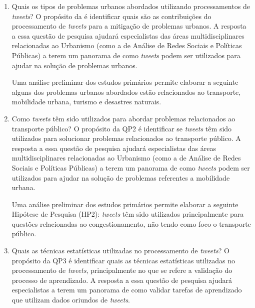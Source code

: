 \documentclass[
	12pt,				%
	oneside,			%
	a4paper,			%
	english,			%
	brazil				%
	]{abntex2ppgsi}
\begin{document}
{{\begin{enumerate}

\item Quais os tipos de problemas urbanos abordados utilizando processamentos de \textit{tweets}?
\label{item:1} \newline \newline
O propósito da  é identificar quais são as contribuições do processamento de \textit{tweets} para a mitigação de problemas urbanos. A resposta a essa questão de pesquisa ajudará especialistas das áreas multidisciplinares relacionadas ao Urbanismo (como a de Análise de Redes Sociais e Políticas Públicas) a terem um panorama de como \textit{tweets} podem ser utilizados para ajudar na solução de problemas urbanos. \newline

Uma análise preliminar dos estudos primários permite elaborar a seguinte  alguns dos problemas urbanos abordados estão relacionados ao transporte, mobilidade urbana, turismo e desastres naturais. \newline

\item Como \textit{tweets} têm sido utilizados para abordar problemas relacionados ao transporte público? \newline \newline
\label{item:2}
O propósito da QP2 é identificar se \textit{tweets} têm sido utilizados para solucionar problemas relacionados ao transporte público. A resposta a essa questão de pesquisa ajudará especialistas das áreas multidisciplinares relacionadas ao Urbanismo (como a de Análise de Redes Sociais e Políticas Públicas) a terem um panorama de como \textit{tweets} podem ser utilizados para ajudar na solução de problemas referentes a mobilidade urbana. \newline

Uma análise preliminar dos estudos primários permite elaborar a seguinte Hipótese de Pesquisa (HP2): \textit{tweets} têm sido utilizados principalmente para questões relacionadas ao congestionamento, não tendo como foco o transporte público.\newline

\item Quais as técnicas estatísticas utilizadas no processamento de \textit{tweets}?
\label{item:3} \newline \newline
O propósito da QP3 é identificar quais as técnicas estatísticas utilizadas no processamento de \textit{tweets}, principalmente no que se refere a validação do processo de aprendizado. A resposta a essa questão de pesquisa ajudará especialistas a terem um panorama de como validar tarefas de aprendizado que utilizam dados oriundos de \textit{tweets}. \newline


\end{enumerate}}}
\end{document}
